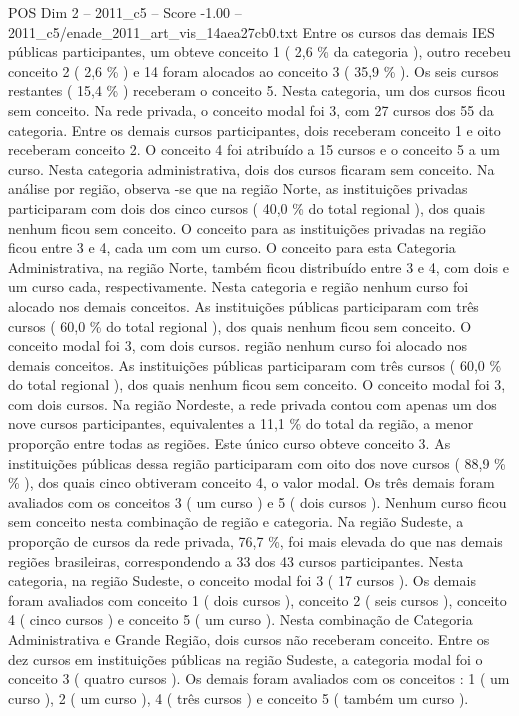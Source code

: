 \begin{textsample}{POS Dim 2 – 2011\_c5 – Score -1.00 – 2011\_c5/enade\_2011\_art\_vis\_14aea27cb0.txt}
Entre os cursos das demais IES públicas participantes, um obteve conceito 1 ( 2,6 \% da categoria ), outro recebeu conceito 2 ( 2,6 \% ) e 14 foram alocados ao conceito 3 ( 35,9 \% ).
Os seis cursos restantes ( 15,4 \% ) receberam o conceito 5.
Nesta categoria, um dos cursos ficou sem conceito.
Na rede privada, o conceito modal foi 3, com 27 cursos dos 55 da categoria.
Entre os demais cursos participantes, dois receberam conceito 1 e oito receberam conceito 2.
O conceito 4 foi atribuído a 15 cursos e o conceito 5 a um curso.
Nesta categoria administrativa, dois dos cursos ficaram sem conceito.
Na análise por região, observa -se que na região Norte, as instituições privadas participaram com dois dos cinco cursos ( 40,0 \% do total regional ), dos quais nenhum ficou sem conceito.
O conceito para as instituições privadas na região ficou entre 3 e 4, cada um com um curso.
O conceito para esta Categoria Administrativa, na região Norte, também ficou distribuído entre 3 e 4, com dois e um curso cada, respectivamente.
Nesta categoria e região nenhum curso foi alocado nos demais conceitos.
As instituições públicas participaram com três cursos ( 60,0 \% do total regional ), dos quais nenhum ficou sem conceito.
O conceito modal foi 3, com dois cursos. região nenhum curso foi alocado nos demais conceitos.
As instituições públicas participaram com três cursos ( 60,0 \% do total regional ), dos quais nenhum ficou sem conceito.
O conceito modal foi 3, com dois cursos.
Na região Nordeste, a rede privada contou com apenas um dos nove cursos participantes, equivalentes a 11,1 \% do total da região, a menor proporção entre todas as regiões.
Este único curso obteve conceito 3.
As instituições públicas dessa região participaram com oito dos nove cursos ( 88,9 \% \% ), dos quais cinco obtiveram conceito 4, o valor modal.
Os três demais foram avaliados com os conceitos 3 ( um curso ) e 5 ( dois cursos ).
Nenhum curso ficou sem conceito nesta combinação de região e categoria.
Na região Sudeste, a proporção de cursos da rede privada, 76,7 \%, foi mais elevada do que nas demais regiões brasileiras, correspondendo a 33 dos 43 cursos participantes.
Nesta categoria, na região Sudeste, o conceito modal foi 3 ( 17 cursos ).
Os demais foram avaliados com conceito 1 ( dois cursos ), conceito 2 ( seis cursos ), conceito 4 ( cinco cursos ) e conceito 5 ( um curso ).
Nesta combinação de Categoria Administrativa e Grande Região, dois cursos não receberam conceito.
Entre os dez cursos em instituições públicas na região Sudeste, a categoria modal foi o conceito 3 ( quatro cursos ).
Os demais foram avaliados com os conceitos : 1 ( um curso ), 2 ( um curso ), 4 ( três cursos ) e conceito 5 ( também um curso ).

\end{textsample}
